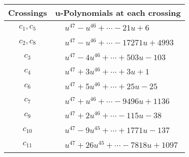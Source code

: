 \documentclass[1p]{elsarticle_modified}
\theoremstyle{definition}
\begin{document}
\begin{tabular}{m{50pt}|m{274pt}}
Crossings & \hspace{64pt}u-Polynomials at each crossing \\
\hline $$\begin{aligned}c_{1},c_{5}\end{aligned}$$&$\begin{aligned}
&u^{47}- u^{46}+\cdots-21 u+6
\end{aligned}$\\
\hline $$\begin{aligned}c_{2},c_{8}\end{aligned}$$&$\begin{aligned}
&u^{47}- u^{46}+\cdots-17271 u+4993
\end{aligned}$\\
\hline $$\begin{aligned}c_{3}\end{aligned}$$&$\begin{aligned}
&u^{47}-4 u^{46}+\cdots+503 u-103
\end{aligned}$\\
\hline $$\begin{aligned}c_{4}\end{aligned}$$&$\begin{aligned}
&u^{47}+3 u^{46}+\cdots+3 u+1
\end{aligned}$\\
\hline $$\begin{aligned}c_{6}\end{aligned}$$&$\begin{aligned}
&u^{47}+5 u^{46}+\cdots+25 u-25
\end{aligned}$\\
\hline $$\begin{aligned}c_{7}\end{aligned}$$&$\begin{aligned}
&u^{47}+u^{46}+\cdots-9496 u+1136
\end{aligned}$\\
\hline $$\begin{aligned}c_{9}\end{aligned}$$&$\begin{aligned}
&u^{47}+2 u^{46}+\cdots-115 u-38
\end{aligned}$\\
\hline $$\begin{aligned}c_{10}\end{aligned}$$&$\begin{aligned}
&u^{47}-9 u^{45}+\cdots+1771 u-137
\end{aligned}$\\
\hline $$\begin{aligned}c_{11}\end{aligned}$$&$\begin{aligned}
&u^{47}+26 u^{45}+\cdots-7818 u+1097
\end{aligned}$\\
\hline
\end{tabular}\\~\\
\end{document}
